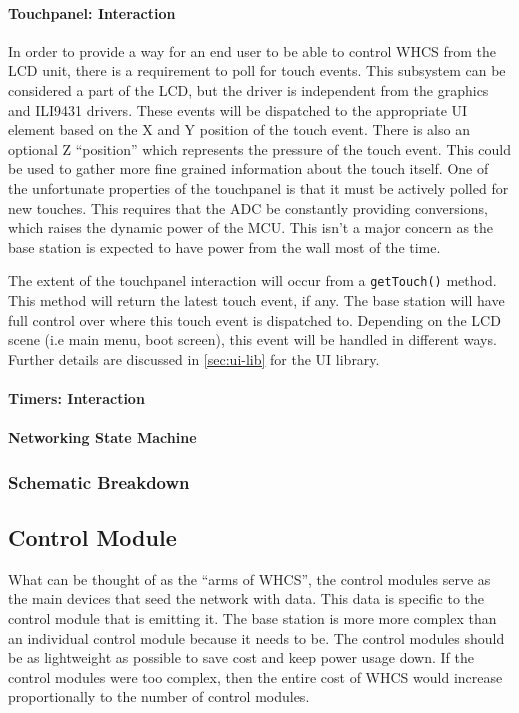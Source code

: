 \paragraph{Touchpanel: Interaction}
In order to provide a way for an end user to be able to control WHCS from the
LCD unit, there is a requirement to poll for touch events.
This subsystem can be considered a part of the LCD, but the driver is independent
from the graphics and ILI9431 drivers. These events will be dispatched
to the appropriate UI element  based on the X and Y position of the touch
event. There is also an optional Z ``position'' which represents the pressure
of the touch event. This could be used to gather more fine grained information
about the touch itself. One of the unfortunate properties of the touchpanel is
that it must be actively polled for new touches. This requires that the ADC be
constantly providing conversions, which raises the dynamic power of the MCU.
This isn't a major concern as the base station is expected to have power from the wall
most of the time.

The extent of the touchpanel interaction will occur from a \texttt{getTouch()}
method. This method will return the latest touch event, if any. The base
station will have full control over where this touch event is dispatched to.
Depending on the LCD scene (i.e main menu, boot screen), this event will be
handled in different ways. Further details are discussed in
\autoref{sec:ui-lib} for the UI library.

\paragraph{Timers: Interaction}

\paragraph{Networking State Machine}

\subsubsection{Schematic Breakdown}


\subsection{Control Module}
What can be thought of as the ``arms of WHCS'', the control modules serve as
the main devices that seed the network with data. This data is specific to the
control module that is emitting it. The base station is more more complex than
an individual control module because it needs to be. The control modules should
be as lightweight as possible to save cost and keep power usage down. If the
control modules were too complex, then the entire cost of WHCS would increase
proportionally to the number of control modules.

